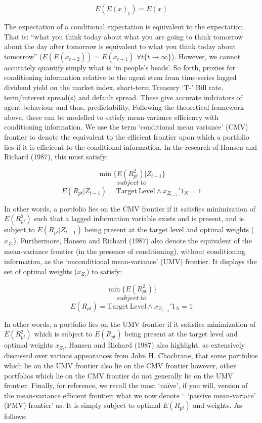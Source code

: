\documentclass[11pt, english]{article}
\begin{document}
        $$E(E(x)_c)=E(x)$$

        The expectation of a conditional expectation is equivalent to the expectation. That is: ``what you think today about what you are going to think tomorrow about the day after tomorrow is equivalent to what you think today about tomorrow'' ($E(E(x_{t+2}))=E(x_{t+1})$ $\forall t\{t\rightarrow\infty\}$). However, we cannot accurately quantify simply what is `in people's heads'. So forth, proxies for conditioning information relative to the agent stem from time-series lagged dividend yield on the market index, short-term Treasury `T-' Bill rate, term/interest spread(s) and default spread. These give accurate indciators of agent behaviour and thus, predictability. Following the theoretical framework above, these can be modelled to satisfy mean-variance efficiency with conditioning information. We use the term `conditional mean variance' (CMV) frontier to denote the equivalent to the efficient frontier upon which a portfolio lies if it is efficicent to the conditional information. In the research of Hansen and Richard (1987), this must satisfy:

	 $$\min\{E(R_{pt}^2)|Z_{t-1}\}$$
        $$subject\ to$$
        $$E(R_{pt}|Z_{t-1})=\mathrm{Target\ Level}\land x_{Z_{t-1}}'1_N=1$$
        
        In other words, a portfolio lies on the CMV frontier if it satisfies minimization of $E(R_{pt}^2)$ such that a lagged information variable exists and is present, and is subject to $E(R_{pt}|Z_{t-1})$ being present at the target level and optimal weights ($x_{Z_t}$). Furthermore, Hansen and Richard (1987) also denote the equivalent of the mean-variance frontier (in the presence of conditioning), without conditioning information, as the `unconditional mean-variance' (UMV) frontier. It displays the set of optimal weights ($x_{Z_t}$) to satisfy:

        $$\min\{E(R_{pt}^2)\}$$
        $$subject\ to$$
        $$E(R_{pt})=\mathrm{Target\ Level}\land x_{Z_{t-1}}'1_N=1$$

        In other words, a portfolio lies on the UMV frontier if it satisfies minimization of $E(R_{pt}^2)$ which is subject to $E(R_{pt})$ being present at the target level and optimal weights $x_{Z_t}$. Hansen and Richard (1987) also highlight, as extensively discussed over various appearances from John H. Chochrane, that some portfolios which lie on the UMV frontier also lie on the CMV frontier however, other portfolios which lie on the CMV frontier do not generally lie on the UMV frontier. Finally, for reference, we recall the most `na\"{i}ve', if you will, version of the mean-variance efficient frontier; what we now denote `\ `passive mean-variace' (PMV) frontier' as. It is simply subject to optimal $E(R_{pt})$ and weights. As follows:
\end{document}
